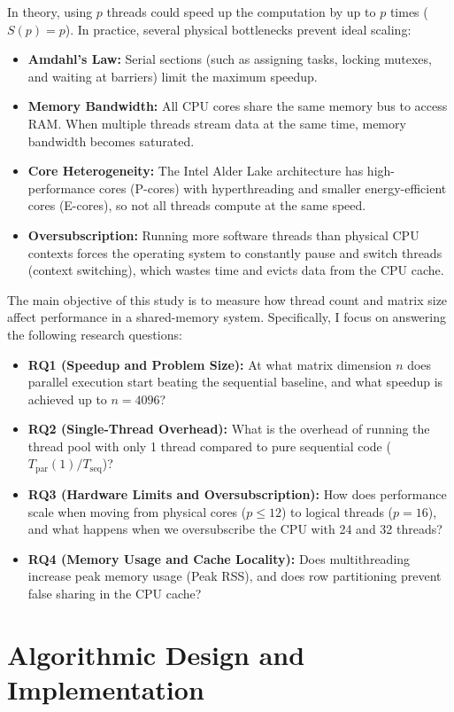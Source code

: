 \documentclass[11pt,a4paper]{article}
\begin{document}
In theory, using $p$ threads could speed up the computation by up to $p$ times ($S(p) = p$). In practice, several physical bottlenecks prevent ideal scaling:
\begin{itemize}
    \item \textbf{Amdahl's Law:} Serial sections (such as assigning tasks, locking mutexes, and waiting at barriers) limit the maximum speedup.
    \item \textbf{Memory Bandwidth:} All CPU cores share the same memory bus to access RAM. When multiple threads stream data at the same time, memory bandwidth becomes saturated.
    \item \textbf{Core Heterogeneity:} The Intel Alder Lake architecture has high-performance cores (P-cores) with hyperthreading and smaller energy-efficient cores (E-cores), so not all threads compute at the same speed.
    \item \textbf{Oversubscription:} Running more software threads than physical CPU contexts forces the operating system to constantly pause and switch threads (context switching), which wastes time and evicts data from the CPU cache.
\end{itemize}

The main objective of this study is to measure how thread count and matrix size affect performance in a shared-memory system. Specifically, I focus on answering the following research questions:

\begin{itemize}
    \item \textbf{RQ1 (Speedup and Problem Size):} At what matrix dimension $n$ does parallel execution start beating the sequential baseline, and what speedup is achieved up to $n = 4096$?
    \item \textbf{RQ2 (Single-Thread Overhead):} What is the overhead of running the thread pool with only 1 thread compared to pure sequential code ($T_{\text{par}}(1) / T_{\text{seq}}$)?
    \item \textbf{RQ3 (Hardware Limits and Oversubscription):} How does performance scale when moving from physical cores ($p \le 12$) to logical threads ($p = 16$), and what happens when we oversubscribe the CPU with 24 and 32 threads?
    \item \textbf{RQ4 (Memory Usage and Cache Locality):} Does multithreading increase peak memory usage (Peak RSS), and does row partitioning prevent false sharing in the CPU cache?
\end{itemize}

\section{Algorithmic Design and Implementation}
\end{document}
